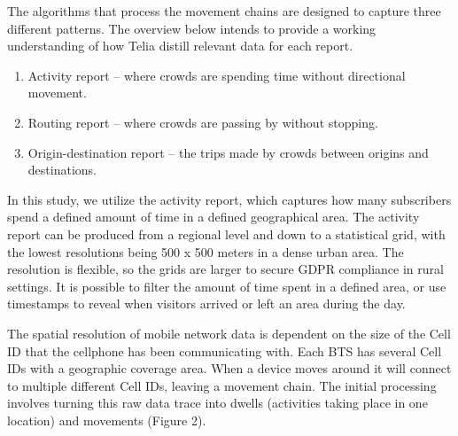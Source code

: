 \documentclass[authordate,empirical]{jote-new-article}
\begin{document}
The algorithms that process the movement chains are designed to capture three different patterns. The overview below intends to provide a working understanding of how Telia distill relevant data for each report.





\begin{enumerate}


  \item Activity report – where crowds are spending time without directional movement.



  \item Routing report – where crowds are passing by without stopping.



  \item Origin-destination report – the trips made by crowds between origins and destinations.


\end{enumerate}





In this study, we utilize the activity report, which captures how many subscribers spend a defined amount of time in a defined geographical area. The activity report can be produced from a regional level and down to a statistical grid, with the lowest resolutions being 500 x 500 meters in a dense urban area. The resolution is flexible, so the grids are larger to secure GDPR compliance in rural settings. It is possible to filter the amount of time spent in a defined area, or use timestamps to reveal when visitors arrived or left an area during the day.







The spatial resolution of mobile network data is dependent on the size of the Cell ID that the cellphone has been communicating with. Each BTS has several Cell IDs with a geographic coverage area. When a device moves around it will connect to multiple different Cell IDs, leaving a movement chain. The initial processing involves turning this raw data trace into dwells (activities taking place in one location) and movements (Figure 2).
\end{document}
